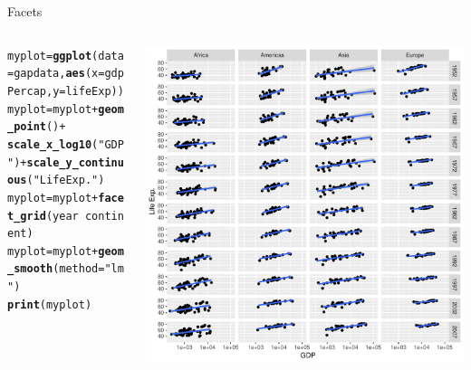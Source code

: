 \documentclass[aspectratio=169]{beamer}\usepackage[]{graphicx}\usepackage[]{color}
\makeatletter
\def\maxwidth{ %
  \ifdim\Gin@nat@width>\linewidth
    \linewidth
  \else
    \Gin@nat@width
  \fi
}
\newcommand{\hlstr}[1]{\textcolor[rgb]{0.192,0.494,0.8}{#1}}%
\newcommand{\hlopt}[1]{\textcolor[rgb]{0,0,0}{#1}}%
\newcommand{\hlstd}[1]{\textcolor[rgb]{0.345,0.345,0.345}{#1}}%
\newcommand{\hlkwb}[1]{\textcolor[rgb]{0.69,0.353,0.396}{#1}}%
\newcommand{\hlkwc}[1]{\textcolor[rgb]{0.333,0.667,0.333}{#1}}%
\newcommand{\hlkwd}[1]{\textcolor[rgb]{0.737,0.353,0.396}{\textbf{#1}}}%
\newenvironment{kframe}{%
 \def\at@end@of@kframe{}%
 \ifinner\ifhmode%
  \def\at@end@of@kframe{\end{minipage}}%
  \begin{minipage}{\columnwidth}%
 \fi\fi%
 \def\FrameCommand##1{\hskip\@totalleftmargin \hskip-\fboxsep
 \colorbox{shadecolor}{##1}\hskip-\fboxsep
     \hskip-\linewidth \hskip-\@totalleftmargin \hskip\columnwidth}%
 \MakeFramed {\advance\hsize-\width
   \@totalleftmargin\z@ \linewidth\hsize
   \@setminipage}}%
 {\par\unskip\endMakeFramed%
 \at@end@of@kframe}
\newenvironment{knitrout}{}{} %
\makeatother
\begin{document}
\begin{frame}[fragile]{Facets}
\begin{columns}
  \begin{column}{0.50\textwidth}
\begin{knitrout}\tiny
{}\color{fgcolor}\begin{kframe}
\begin{alltt}
\hlstd{myplot} \hlkwb{=} \hlkwd{ggplot}\hlstd{(}\hlkwc{data}\hlstd{=gapdata,} \hlkwd{aes}\hlstd{(}\hlkwc{x}\hlstd{=gdpPercap,} \hlkwc{y}\hlstd{=lifeExp))}
\hlstd{myplot} \hlkwb{=} \hlstd{myplot} \hlopt{+} \hlkwd{geom_point}\hlstd{()} \hlopt{+}
  \hlkwd{scale_x_log10}\hlstd{(}\hlstr{"GDP"}\hlstd{)} \hlopt{+} \hlkwd{scale_y_continuous}\hlstd{(}\hlstr{"Life Exp."}\hlstd{)}
\hlstd{myplot} \hlkwb{=} \hlstd{myplot} \hlopt{+} \hlkwd{facet_grid}\hlstd{(year}\hlopt{~}\hlstd{continent)}
\hlstd{myplot} \hlkwb{=} \hlstd{myplot} \hlopt{+} \hlkwd{geom_smooth}\hlstd{(}\hlkwc{method}\hlstd{=}\hlstr{"lm"}\hlstd{)}
\hlkwd{print}\hlstd{(myplot)}
\end{alltt}
\end{kframe}
\end{knitrout}
  \end{column}
  \begin{column}{0.5\textwidth}
\begin{knitrout}\scriptsize
{}\color{fgcolor}
\includegraphics[width=\maxwidth]{figure/unnamed-chunk-29-1} 

\end{knitrout}
  \end{column}
\end{columns}
\end{frame}
\end{document}
